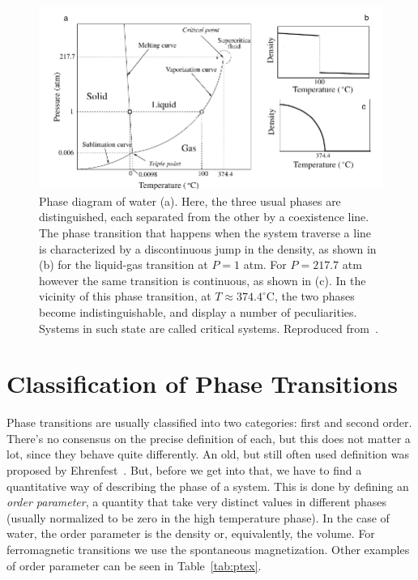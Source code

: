\begin{figure}
\begin{center}
    \includegraphics[width=\textwidth]{chapters/ch2-crit/figs/water}
\end{center}
\caption{Phase diagram of water (a). Here, the three usual phases are
    distinguished, each separated from the other by a coexistence line. The
    phase transition that happens when the system traverse a line is
    characterized by a discontinuous jump in the density, as shown in (b) for
    the liquid-gas transition at $P=1$ atm. For $P=217.7$ atm however the same
    transition is continuous, as shown in (c). In the vicinity of this phase
    transition, at $T\approx374.4^\circ$C, the two phases become
    indistinguishable, and display a number of peculiarities. Systems in such
    state are called critical systems. Reproduced from~\cite{Sole2011}.}
\label{fig:water}
\end{figure}


\section{Classification of Phase Transitions}
\label{sec:classification}

Phase transitions are usually classified into two categories: first and second
order. There's no consensus on the precise definition of each, but this does
not matter a lot, since they behave quite differently. An old, but still often
used definition was proposed by Ehrenfest~\cite{Jaeger1998}. But, before we get
into that, we have to find a quantitative way of describing the phase of a
system. This is done by defining an \textit{order parameter}, a quantity that
take very distinct values in different phases (usually normalized to be zero in
the high temperature phase). In the case of water, the order parameter is the
density or, equivalently, the volume. For ferromagnetic transitions we use the
spontaneous magnetization. Other examples of order parameter can be seen in
Table~\ref{tab:ptex}.


